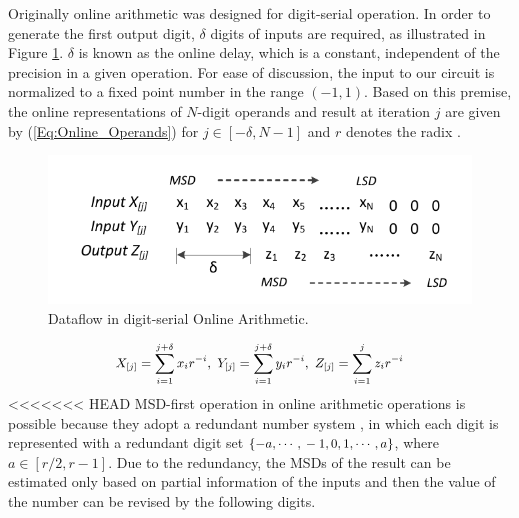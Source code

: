 \documentclass{acm_proc_article-sp}
\begin{document}
Originally online arithmetic was designed for digit-serial operation. In order to generate the first output digit, $\delta$ digits of inputs are required, as illustrated in Figure \ref{Fig:OnlineDataFlow}. $\delta$ is known as the online delay, which is a constant, independent of the precision in a given operation. For ease of discussion, the input to our circuit is normalized to a fixed point number in the range $(-1,1)$. Based on this premise, the online representations of $N$-digit operands and result at iteration $j$ are given by (\ref{Eq:Online_Operands}) for $j\in[-\delta,N-1]$ and $r$ denotes the radix \cite{Ercegovac_Book}.
\vspace{-1ex}
%
\begin{figure}[htbp]
  \centering
  \vspace{-2.5ex}
  \includegraphics[width=.44\textwidth]{./Figures/OnlineArithmetic_DataFlow.pdf}
  \vspace{-3ex}
  \caption{Dataflow in digit-serial Online Arithmetic.}
  \label{Fig:OnlineDataFlow}
\end{figure}
%
\begin{eqnarray}\label{Eq:Online_Operands}
\footnotesize
  X_{[j]}=\sum_{i=1}^{j+\delta}x_ir^{-i},~Y_{[j]}=\sum_{i=1}^{j+\delta}y_ir^{-i},~Z_{[j]}=\sum_{i=1}^{j}z_ir^{-i}
\normalsize
\end{eqnarray}
%
<<<<<<< HEAD
MSD-first operation in online arithmetic operations is possible because they adopt a redundant number system \cite{RedundantNumber}, in which each digit is represented with a redundant digit set $\{-a, \cdots,\\-1, 0, 1, \cdots, a\}$, where $a\in[r/2,r-1]$. Due to the redundancy, the MSDs of the result can be estimated only based on partial information of the inputs and then the value of the number can be revised by the following digits.
\end{document}
